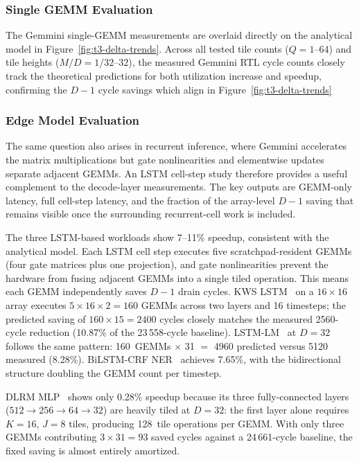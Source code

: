 \subsubsection{Single GEMM Evaluation}

The Gemmini single-GEMM measurements are overlaid directly on the
analytical model in Figure~\ref{fig:t3-delta-trends}. Across all tested
tile counts ($Q{=}1$--$64$) and tile heights ($M/D{=}1/32$--$32$), the measured Gemmini RTL cycle counts closely track the theoretical predictions for both utilization increase and speedup, confirming the $D-1$ cycle savings which align in Figure~\ref{fig:t3-delta-trends}


\subsubsection{Edge Model Evaluation}

The same question also arises in recurrent inference, where Gemmini accelerates
the matrix multiplications but gate nonlinearities and elementwise updates
separate adjacent GEMMs. An LSTM cell-step study therefore provides a useful
complement to the decode-layer measurements. The key outputs are GEMM-only
latency, full cell-step latency, and the fraction of the array-level $D{-}1$
saving that remains visible once the surrounding recurrent-cell work is
included.

The three LSTM-based workloads show 7--11\% speedup, consistent with
the analytical model. Each LSTM cell step executes five scratchpad-resident
GEMMs (four gate matrices plus one projection), and gate nonlinearities
prevent the hardware from fusing adjacent GEMMs into a single tiled
operation. This means each GEMM independently saves $D{-}1$ drain cycles.
KWS LSTM~\cite{arik_convolutional_2017} on a $16{\times}16$ array executes
$5 \times 16 \times 2 = 160$ GEMMs across two layers and 16 timesteps;
the predicted saving of $160 \times 15 = 2400$ cycles closely matches the
measured 2560-cycle reduction (10.87\% of the 23\,558-cycle baseline).
LSTM-LM~\cite{sak_long_2014} at $D{=}32$ follows the same pattern:
160~GEMMs $\times$ 31 $=$ 4960 predicted versus 5120 measured (8.28\%).
BiLSTM-CRF NER~\cite{lample_neural_2016} achieves 7.65\%, with the
bidirectional structure doubling the GEMM count per timestep.

DLRM MLP~\cite{naumov_deep_2019} shows only 0.28\% speedup because its
three fully-connected layers ($512{\to}256{\to}64{\to}32$) are heavily
tiled at $D{=}32$: the first layer alone requires $K{=}16$, $J{=}8$ tiles,
producing 128~tile operations per GEMM. With only three GEMMs contributing
$3 \times 31 = 93$ saved cycles against a 24\,661-cycle baseline,
the fixed saving is almost entirely amortized.



